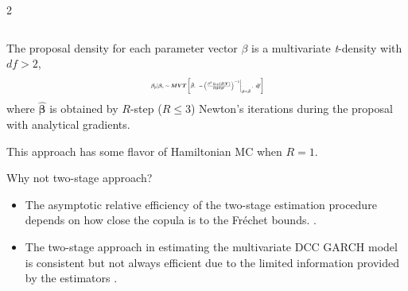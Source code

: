 \documentclass[a0paper,portrait,fontscale = 0.39,margin=2.5em]{baposter/baposter}
\begin{document}
\begin{poster}
{\begin{multicols}{2}
\begin{compactitem}
{\begin{tabular}{llll}
                                                                                                                                                                                                                                                                                                                                                                                                                                                                                                                                                                                                                                                                                                                                                                                                                                                                                 \bottomrule
          \end{tabular}
        }


      \item The proposal density for each parameter vector $\beta$ is a multivariate
        \emph{t}-density with  $df>2$,
        {\color{blue}
          \begin{align*}
            \resizebox{0.3\textwidth}{!}{
            $\bm{\beta}_{p} |\bm{\beta}_{c}\sim\bm{MVT}\left[\bm{\hat{\beta}},~\left.-\left(\frac{\partial^{2}\ln
            p(\bm{\beta}|\bm{Y})}{\partial\bm{\beta}\partial\bm{\beta}^{\prime}}\right)^{-1}\right\vert
            _{\bm{\beta}=\bm{\hat{\beta}}},~df\right]
            $}
          \end{align*}}
        where $\bm{\hat{\beta}}$ is obtained by $R$-step ($R\leq 3$) Newton's
        iterations during the proposal with analytical gradients.

      \item This approach has some flavor of Hamiltonian MC when $R=1$.


          \item Why not two-stage approach?
  \begin{itemize}
  \item The asymptotic relative efficiency of the two-stage estimation procedure depends
    on how close the copula is to the Fr\'echet bounds.
    {\color{blue}\citep{joe2005asymptotic}}.
  \item The two-stage approach in estimating the multivariate DCC GARCH model is
    consistent but not always efficient due to the limited information provided by the
    estimators {\color{blue}\citep{engle2001theoretical}}.
  \end{itemize}



\end{compactitem}
\end{multicols}}
\end{poster}
\end{document}
